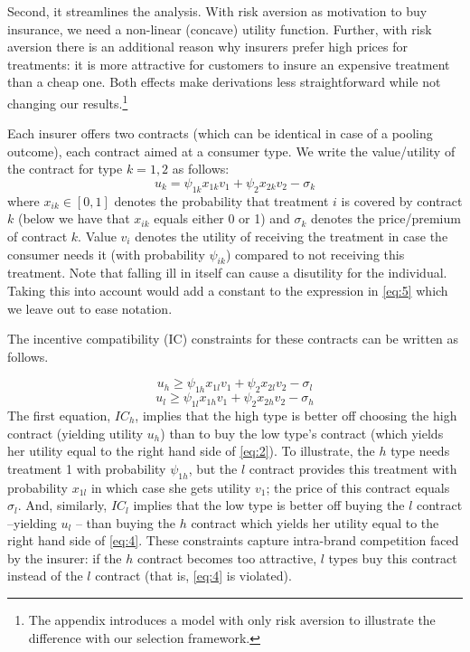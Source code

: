 \documentclass[a4paper,12pt]{article}
\begin{document}
Second, it streamlines the analysis. With risk aversion as motivation to buy insurance, we need a non-linear (concave) utility function. Further, with risk aversion there is an additional reason why insurers prefer high prices for treatments: it is more attractive for customers to insure an expensive treatment than a cheap one. Both effects make derivations less straightforward while not changing our results.\footnote{The appendix introduces a model with only risk aversion to illustrate the difference with our selection framework.}

Each insurer offers two contracts (which can be identical in case of a pooling outcome), each contract aimed at a consumer type. We write the value/utility of the contract for type \(k=1,2\) as follows:
\begin{equation}
\label{eq:5}
u_{k} = \psi_{1k} x_{1k} v_1 + \psi_{2} x_{2k} v_2 - \sigma_k
\end{equation}
where \(x_{ik} \in [0,1]\) denotes the probability that treatment \(i\) is covered by contract \(k\) (below we have that \(x_{ik}\) equals either 0 or 1) and \(\sigma_k\) denotes the price/premium of contract \(k\). Value \(v_i\) denotes the utility of receiving the treatment in case the consumer needs it (with probability \(\psi_{ik}\)) compared to not receiving this treatment. Note that falling ill in itself can cause a disutility for the individual. Taking this into account would add a constant to the expression in \eqref{eq:5} which we leave out to ease notation.

The incentive compatibility (IC) constraints for these contracts can be written as follows.

\begin{equation}
\label{eq:2}
u_h \geq  \psi_{1h} x_{1l} v_1 + \psi_{2} x_{2l} v_2 - \sigma_{l}
\end{equation}
\begin{equation}
\label{eq:4}
u_l \geq  \psi_{1l} x_{1h} v_1 + \psi_{2} x_{2h} v_2 - \sigma_h
\end{equation}
The first equation, \(IC_h\), implies that the high type is better off choosing the high contract (yielding utility \(u_h\)) than to buy the low type's contract (which yields her utility equal to the right hand side of \eqref{eq:2}). To illustrate, the \(h\) type needs treatment 1 with probability \(\psi_{1h}\), but the \(l\) contract provides this treatment with probability \(x_{1l}\) in which case she gets utility \(v_{1}\); the price of this contract equals \(\sigma_{l}\). And, similarly, \(IC_l\) implies that the low type is better off buying the \(l\) contract --yielding \(u_l\) -- than buying the \(h\) contract which yields her utility equal to the right hand side of \eqref{eq:4}. These constraints capture intra-brand competition faced by the insurer: if the \(h\) contract becomes too attractive, \(l\) types buy this contract instead of the \(l\) contract (that is, \eqref{eq:4} is violated).
\end{document}
